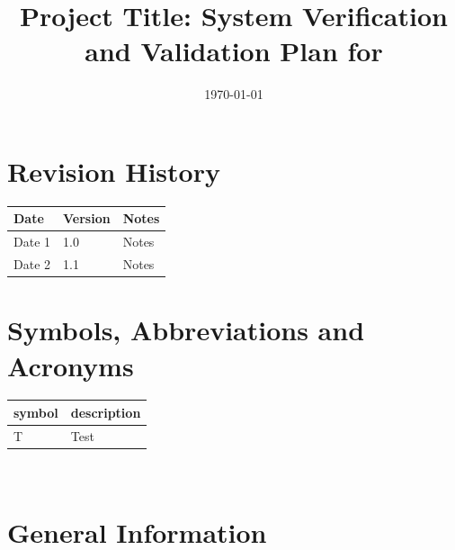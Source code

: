 \documentclass[12pt, titlepage]{article}
\begin{document}
\title{Project Title: System Verification and Validation Plan for \progname{}} 
\author{\authname}
\date{\today}
	
\maketitle


\section{Revision History}

\begin{tabularx}{\textwidth}{p{3cm}p{2cm}X}
\toprule {\bf Date} & {\bf Version} & {\bf Notes}\\
\midrule
Date 1 & 1.0 & Notes\\
Date 2 & 1.1 & Notes\\
\bottomrule
\end{tabularx}

\newpage

\tableofcontents

\listoftables
{}

\listoffigures
{}

\newpage

\section{Symbols, Abbreviations and Acronyms}

\renewcommand{\arraystretch}{1.2}
\begin{tabular}{l l} 
  \toprule		
  \textbf{symbol} & \textbf{description}\\
  \midrule 
  T & Test\\
  \bottomrule
\end{tabular}\\



\newpage


\section{General Information}
\end{document}
